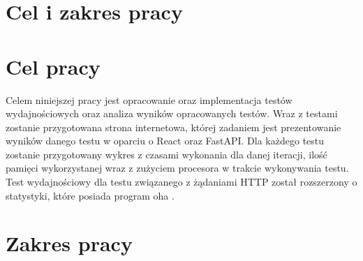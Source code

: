 \section*{Cel i zakres pracy}

\section*{Cel pracy}
Celem niniejszej pracy jest opracowanie oraz implementacja testów wydajnościowych oraz analiza wyników opracowanych testów. Wraz z testami zostanie przygotowana strona internetowa, której zadaniem jest prezentowanie wyników danego testu w oparciu o React oraz FastAPI. Dla każdego testu zostanie przygotowany wykres z czasami wykonania dla danej iteracji, ilość pamięci wykorzystanej wraz z zużyciem procesora w trakcie wykonywania testu. Test wydajnościowy dla testu związanego z żądaniami HTTP został rozszerzony o statystyki, które posiada program oha \cite{oha}.

\section*{Zakres pracy}
